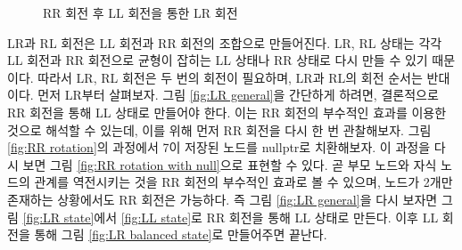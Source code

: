 \documentclass{article}
\begin{document}
\begin{figure}
    \centering
    \caption{RR 회전 후 LL 회전을 통한 LR 회전}
    \label{fig:LR balancing process}
\end{figure}

LR과 RL 회전은 LL 회전과 RR 회전의 조합으로 만들어진다. LR, RL 상태는 각각 LL 회전과 RR 회전으로 균형이 잡히는 LL 상태나 RR 상태로 다시 만들 수 있기 때문이다. 따라서 LR, RL 회전은 두 번의 회전이 필요하며, LR과 RL의 회전 순서는 반대이다. 먼저 LR부터 살펴보자. 그림 \ref{fig:LR general}을 간단하게 하려면, 결론적으로 RR 회전을 통해 LL 상태로 만들어야 한다. 이는 RR 회전의 부수적인 효과를 이용한 것으로 해석할 수 있는데, 이를 위해 먼저 RR 회전을 다시 한 번 관찰해보자. 그림 \ref{fig:RR rotation}의 과정에서 7이 저장된 노드를 nullptr로 치환해보자. 이 과정을 다시 보면 그림 \ref{fig:RR rotation with null}으로 표현할 수 있다. 곧 부모 노드와 자식 노드의 관계를 역전시키는 것을 RR 회전의 부수적인 효과로 볼 수 있으며, 노드가 2개만 존재하는 상황에서도 RR 회전은 가능하다. 즉 그림 \ref{fig:LR general}을 다시 보자면 그림 \ref{fig:LR state}에서 \ref{fig:LL state}로 RR 회전을 통해 LL 상태로 만든다. 이후 LL 회전을 통해 그림 \ref{fig:LR balanced state}로 만들어주면 끝난다.
\end{document}

